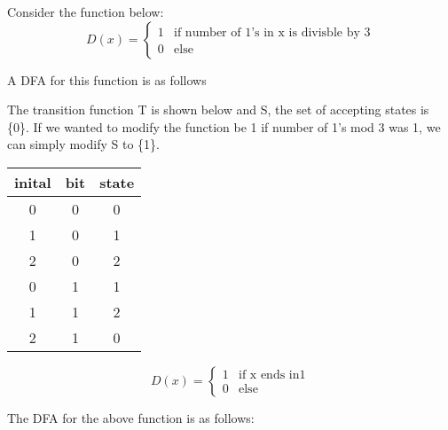 \begin{example}
    
    Consider the function below:
    \begin{equation}
        D(x) =
        \begin{cases}
            1 & \text{if number of 1's in x is divisble by 3} \\
            0 & \text{else}
        \end{cases}
    \end{equation}

    A DFA for this function is as follows
    \begin{center}
    \end{center}

    The transition function T is shown below and S, the set of accepting states is \{0\}. If we wanted to modify the function be 1 if number of 1's mod 3 was 1, we can simply modify S to \{1\}. 

    \begin{center}
        \begin{tabular}{ |c|c|c| }
            inital & bit & state \\
            \hline
            0 & 0 & 0 \\
            1 & 0 & 1 \\
            2 & 0 & 2 \\
            0 & 1 & 1 \\
            1 & 1 & 2 \\
            2 & 1 & 0 \\
        \end{tabular}
    \end{center}

\end{example}

\begin{example}
    \begin{equation}
        D(x) = 
        \begin{cases}
            1 & \text{if x ends in} 1 \\
            0 & \text{else}
        \end{cases}
    \end{equation}

    The DFA for the above function is as follows:
    \begin{center}
    \end{center}
\end{example}

